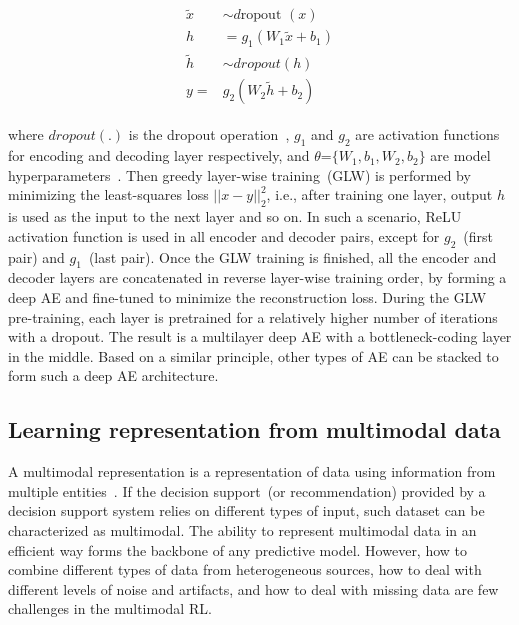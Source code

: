 \vspace{-6mm}
\begin{align}
    \begin{aligned}
        \tilde{x} & \sim d \text {ropout }(x) \\
        h &=g_{1}\left(W_{1} \tilde{x}+b_{1}\right) \\
        \tilde{h} & \sim d r o p o u t(h) \\
        y=& g_{2}\left(W_{2} \tilde{h}+b_{2}\right)
    \end{aligned}
\end{align}

\noindent where $dropout(.)$ is the dropout operation~\cite{srivastava2014dropout}, $g_1$ and $g_2$ are activation functions for encoding and decoding layer respectively, and $\theta$=$\lbrace{W_1, b_1, W_2, b_2}\rbrace$ are model hyperparameters~\cite{xie2016unsupervised}. Then greedy layer-wise training~(GLW) is performed by minimizing the least-squares loss $||x-y||^{2}_{2}$, i.e., after training one layer, output $h$ is used as the input to the next layer and so on. In such a scenario, ReLU activation function is used in all encoder and decoder pairs, except for $g_2$~(first pair) and $g_1$~(last pair). Once the GLW training is finished, all the encoder and decoder layers are concatenated in reverse layer-wise training order, by forming a deep AE and fine-tuned to minimize the reconstruction loss. During the GLW pre-training, each layer is pretrained for a relatively higher number of iterations with a dropout. The result is a multilayer deep AE with a bottleneck-coding layer in the middle. Based on a similar principle, other types of AE can be stacked to form such a deep AE architecture. 
\fi 

\subsection{Learning representation from multimodal data}
A multimodal representation is a representation of data using information from multiple entities~\cite{mmsurvey}. If the decision support~(or recommendation) provided by a decision support system relies on different types of input, such dataset can be characterized as multimodal. The ability to represent multimodal data in an efficient way forms the backbone of any predictive model. However, how to combine different types of data from heterogeneous sources, how to deal with different levels of noise and artifacts, and how to deal with missing data are few challenges in the multimodal RL. 

